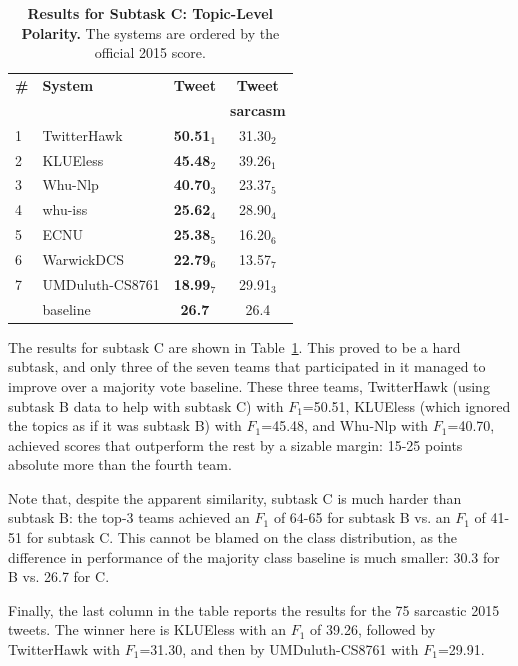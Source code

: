 \documentclass[11pt]{article}
\begin{document}
\begin{table}[t!]
\begin{center}
\small{
\begin{tabular}{llcc}
 \hline
 \bf \# & \bf System & \bf Tweet & \bf Tweet\\
  & & & \bf sarcasm \\
 \hline
  1 & TwitterHawk & \bf 50.51$_1$ & 31.30$_2$ \\
  2 & KLUEless & \bf 45.48$_2$ & 39.26$_1$ \\
  3 & Whu-Nlp & \bf 40.70$_3$ & 23.37$_5$ \\
  4 & whu-iss & \bf 25.62$_4$ & 28.90$_4$ \\
  5 & ECNU & \bf 25.38$_5$ & 16.20$_6$ \\
  6 & WarwickDCS & \bf 22.79$_6$ & 13.57$_7$ \\
  7 & UMDuluth-CS8761 & \bf 18.99$_7$ & 29.91$_3$\\ \hline
& baseline & \bf 26.7 & 26.4\\
\hline
\end{tabular}
}
\caption{\textbf{Results for Subtask C: Topic-Level Polarity.}
             The systems are ordered by the official 2015 score.}
\label{tab:res-subtaskC}
\end{center}
\vspace*{-5mm}
\end{table}

The results for subtask C are shown in Table~\ref{tab:res-subtaskC}.
This proved to be a hard subtask, and only three of the seven teams that participated in it
managed to improve over a majority vote baseline.
These three teams,
TwitterHawk (using subtask B data to help with subtask C) with $F_1$=50.51,
KLUEless (which ignored the topics as if it was subtask B) with $F_1$=45.48,
and
Whu-Nlp with $F_1$=40.70,
achieved scores that outperform the rest by a sizable margin:
15-25 points absolute more than the fourth team.

Note that, despite the apparent similarity,
subtask C is much harder than subtask B:
the top-3 teams achieved an $F_1$ of 64-65 for subtask B vs. an $F_1$ of 41-51 for subtask C.
This cannot be blamed on the class distribution,
as the difference in performance of the majority class baseline is much smaller:
30.3 for B vs. 26.7 for C.


Finally, the last column in the table reports the results for the 75 sarcastic 2015 tweets. The winner here is KLUEless with an $F_1$ of 39.26,
followed by TwitterHawk with $F_1$=31.30,
and then by UMDuluth-CS8761 with $F_1$=29.91.
\end{document}
